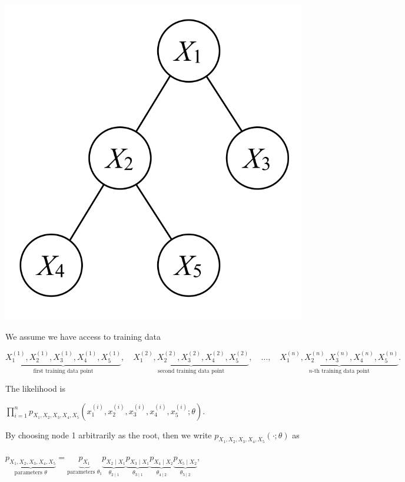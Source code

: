 {\centering\includegraphics[scale=0.3]{images_sec-graphical-models-five-node-example} \par}

We assume we have access to training data

{\centering$\underbrace{X_{1}^{(1)},X_{2}^{(1)},X_{3}^{(1)},X_{4}^{(1)},X_{5}^{(1)}}_{\text {first training data point}},\quad \underbrace{X_{1}^{(2)},X_{2}^{(2)},X_{3}^{(2)},X_{4}^{(2)},X_{5}^{(2)}}_{\text {second training data point}},\quad \dots ,\quad \underbrace{X_{1}^{(n)},X_{2}^{(n)},X_{3}^{(n)},X_{4}^{(n)},X_{5}^{(n)}}_{n\text {-th training data point}}.$ \par}
 
The likelihood is

{\centering$\prod _{i=1}^{n}p_{X_{1},X_{2},X_{3},X_{4},X_{5}}(x_{1}^{(i)},x_{2}^{(i)},x_{3}^{(i)},x_{4}^{(i)},x_{5}^{(i)};\theta ).$ \par}
 
By choosing node 1 arbitrarily as the root, then we write $p_{X_{1},X_{2},X_{3},X_{4},X_{5}}(\cdot ;\theta )$ as

{\centering$\underbrace{p_{X_{1},X_{2},X_{3},X_{4},X_{5}}}_{\text {parameters }\theta }=\underbrace{p_{X_{1}}}_{\text {parameters }\theta _{1}}\underbrace{p_{X_{2}\mid X_{1}}}_{\theta _{2\mid 1}}\underbrace{p_{X_{3}\mid X_{1}}}_{\theta _{3\mid 1}}\underbrace{p_{X_{4}\mid X_{2}}}_{\theta _{4\mid 2}}\underbrace{p_{X_{5}\mid X_{2}}}_{\theta _{5\mid 2}},$ \par}
 
